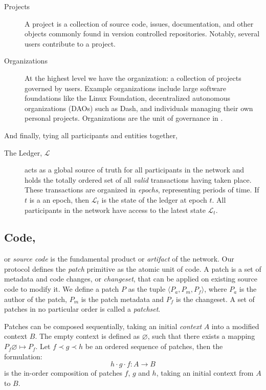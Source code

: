 \begin{description}
    \item[Projects] A project is a collection of source code, issues,
        documentation, and other objects commonly found in version
        controlled repositories. Notably, several users contribute to a
        project.
    \item[Organizations] At the highest level we have the organization: a
        collection of projects governed by users. Example organizations
        include large software foundations like the Linux Foundation,
        decentralized autonomous organizations (DAOs) such as Dash, and
        individuals managing their own personal projects. Organizations are
        the unit of governance in \oscoin{}.
\end{description}
\addvspace{1em}

And finally, tying all participants and entities together,

\begin{description}
    \item[The Ledger, $\mathcal{L}$] acts as a global source of truth for all
        participants in the network and holds the totally ordered set of all
        \emph{valid} transactions having taken place. These transactions are
        organized in \emph{epochs}, representing periods of time. If $t$ is a
        an epoch, then $\mathcal{L}_t$ is the state of the ledger at epoch $t$.
        All participants in the network have access to the latest state
        $\mathcal{L}_t$.
\end{description}


\subsection{Code,} or \emph{source code} is the fundamental product or
\emph{artifact} of the \oscoin{} network. Our protocol defines the \emph{patch}
primitive as the atomic unit of code. A patch is a set of metadata and code
changes, or \emph{changeset}, that can be applied on existing source
code to modify it. We define a patch $P$ as the tuple $\langle P_a, P_m, P_f
\rangle$, where $P_a$ is the author of the patch, $P_m$ is the patch metadata
and $P_f$ is the changeset. A set of patches in no particular order is called a
\emph{patchset}.

Patches can be composed sequentially, taking an initial \emph{context} $A$ into
a modified context $B$. The empty context is defined as $\varnothing$, such
that there exists a mapping $P_f \varnothing \mapsto P_f$.  Let $f \prec g
\prec h$ be an ordered sequence of patches, then the formulation:
\[
h \cdot g \cdot f : A \to B
\]
is the in-order composition of patches $f$, $g$ and $h$, taking an initial
context from $A$ to $B$.

